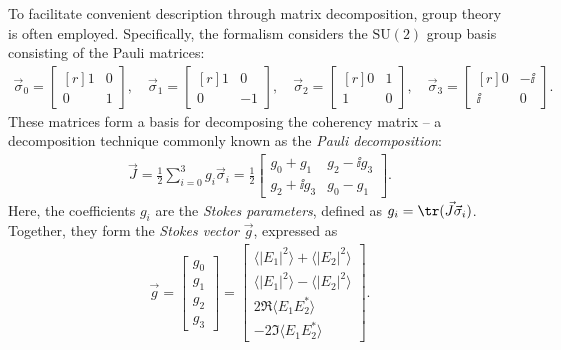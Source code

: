 To facilitate convenient description through matrix decomposition, group theory is often employed.
Specifically, the formalism considers the $\mathrm{SU}(2)$ group basis consisting of the Pauli matrices:
\begin{align}
    \label{eq:pauli-matrices}
    \vec\sigma_0 = \begin{bmatrix*}[r] 1 & 0 \\ 0 & 1 \end{bmatrix*}, \quad
    \vec\sigma_1 = \begin{bmatrix*}[r] 1 & 0 \\ 0 & -1 \end{bmatrix*}, \quad
    \vec\sigma_2 = \begin{bmatrix*}[r] 0 & 1 \\ 1 & 0 \end{bmatrix*}, \quad
    \vec\sigma_3 = \begin{bmatrix*}[r] 0 & -\ii \\ \ii & 0 \end{bmatrix*}.
\end{align}
These matrices form a basis for decomposing the coherency matrix -- a decomposition technique commonly known as the \emph{Pauli decomposition}:
\begin{align}
    \label{eq:pauli-decomposition}
    \vec J = \frac{1}{2} \sum_{i=0}^3 g_i \vec\sigma_i = \frac 12 \begin{bmatrix}
        g_0 + g_1 & g_2 - \ii g_3 \\
        g_2 + \ii g_3 & g_0 - g_1
    \end{bmatrix}.
\end{align}
Here, the coefficients $g_i$ are the \emph{Stokes parameters}, defined as $g_i = \tr(\vec J \vec\sigma_i)$.
Together, they form the \emph{Stokes vector} $\vec g$, expressed as~\parencite{leePolarimetricRadarImaging2017}
\begin{align}
    \label{eq:stokes-vector}
    \vec g = \begin{bmatrix} g_0 \\ g_1 \\ g_2 \\ g_3 \end{bmatrix} = \begin{bmatrix}
        \langle |E_1|^2 \rangle + \langle |E_2|^2 \rangle \\
        \langle |E_1|^2 \rangle - \langle |E_2|^2 \rangle \\
        2 \Re\langle E_1 E_2^* \rangle \\
        -2 \Im\langle E_1 E_2^* \rangle
    \end{bmatrix}.
\end{align}

